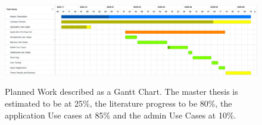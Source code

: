     \begin{figure}[h]
      \caption{Planned Work described as a Gantt Chart. The master thesis is estimated to be at 25\%, the literature progress to be 80\%, the application Use cases at 85\% and the admin Use Cases at 10\%.}
      \centering
      \includegraphics[width=\textwidth]{figs/Gantt}
      \label{fig:figure1}
    \end{figure}
